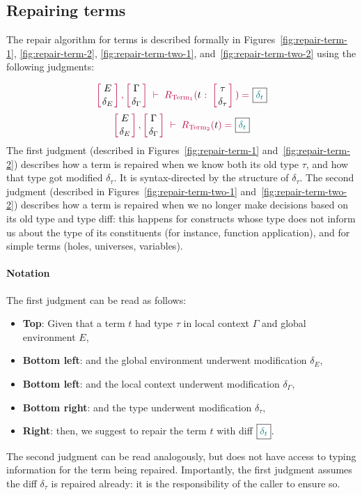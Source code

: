 \subsection{Repairing terms}\label{chick-design-repair-term}

The repair algorithm for terms is described formally in
Figures~\ref{fig:repair-term-1}, \ref{fig:repair-term-2},
\ref{fig:repair-term-two-1}, and~\ref{fig:repair-term-two-2} using the following
judgments:

{
  \[
    {\turnstile
      { \dcontext{E}{\delta_E}{\Gamma}{\delta_\Gamma} }
      {\repair{t}{\delta_t}{\tau}{\delta_\tau}}
    }
  \]
  \[
    {\turnstile
      { \dcontext{E}{\delta_E}{\Gamma}{\delta_\Gamma} }
      {\repairTermWithoutType{t}{\delta_t}}
    }
  \]
}%
%
The first judgment (described in Figures~\ref{fig:repair-term-1}
and~\ref{fig:repair-term-2}) describes how a term is repaired when we know both
its old type $\tau$, and how that type got modified $\delta_\tau$.  It is
syntax-directed by the structure of $\delta_\tau$.  The second judgment
(described in Figures~\ref{fig:repair-term-two-1}
and~\ref{fig:repair-term-two-2}) describes how a term is repaired when we no
longer make decisions based on its old type and type diff: this happens for
constructs whose type does not inform us about the type of its constituents (for
instance, function application), and for simple terms (holes, universes,
variables).

\paragraph{Notation} The first judgment can be read as follows:

\begin{itemize}

  \item \textbf{Top}: Given that a term $t$ had type $\tau$ in local context
$\Gamma$ and global environment $E$,

  \item \textbf{Bottom left}: and the global environment underwent modification
$\delta_{E}$,

  \item \textbf{Bottom left}: and the local context underwent modification
$\delta_{\Gamma}$,

  \item \textbf{Bottom right}: and the type underwent modification
$\delta_{\tau}$,

  \item \textbf{Right}: then, we suggest to repair the term $t$ with diff
$\boxed{ \textcolor{teal}{\delta_{t}} }$.

\end{itemize}

\noindent The second judgment can be read analogously, but does not have access
to typing information for the term being repaired.  Importantly, the first
judgment assumes the diff $\delta_\tau$ is repaired already: it is the
responsibility of the caller to ensure so.




